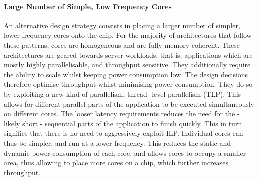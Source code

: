 \paragraph{Large Number of Simple, Low Frequency Cores} An alternative
design strategy consists in placing a larger number of simpler, lower frequency cores
onto the chip. For the majority of architectures that follow these patterns, 
cores are homogeneous and are fully memory coherent. These architectures are
geared towards server workloads, that is, applications which  are mostly highly 
parallelisable, and throughput sensitive. They additionally require the ability
to scale whilst keeping power consumption low.   The design decisions therefore
 optimise throughput whilst minimising power consumption. 
They do so by exploiting a new kind of parallelism, thread-
level-parallelism (TLP). This allows for different parallel parts of the application
to be executed simultaneously on different cores. The looser latency 
requirements reduces the need for the - likely short - sequential
parts of the application to finish quickly. This in turn signifies that
there is no need to aggressively exploit ILP. Individual cores can thus be 
simpler, and run at a lower frequency. This reduces the static and dynamic
power consumption of each core, and allows cores to occupy a smaller
area, thus allowing to place more cores on a chip, which further increases throughput. 


